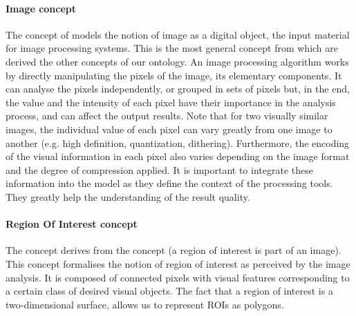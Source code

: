 \paragraph{Image concept} %
\label{par:image_concept}

The concept of  models the notion of image as a digital object, the input material for image processing systems.
This is the most general concept from which are derived the other concepts of our ontology.
An image processing algorithm works by directly manipulating the pixels of the image, its elementary components.
It can analyse the pixels independently, or grouped in sets of pixels but, in the end, the value and the intensity of each pixel have their importance in the analysis process, and can affect the output results.
Note that for two visually similar images, the individual value of each pixel can vary greatly from one image to another (e.g. high definition, quantization, dithering).
Furthermore, the encoding of the visual information in each pixel also varies depending on the image format and the degree of compression applied.
It is important to integrate these information into the model as they define the context of the processing tools.
They greatly help the understanding of the result quality.

\paragraph{Region Of Interest concept} %
\label{par:region_concept}

The concept  derives from the concept  (a region of interest is part of an image).
This concept formalises the notion of region of interest as perceived by the image analysis.
It is composed of connected pixels with visual features corresponding to a certain class of desired visual objects.
The fact that a region of interest is a two-dimensional surface, allows us to represent ROIs as polygons.


